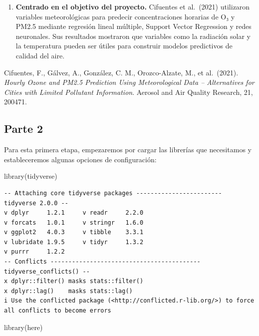 \documentclass[
  letterpaper,
  DIV=11,
  numbers=noendperiod]{scrartcl}
\newenvironment{Shaded}{\begin{snugshade}}{\end{snugshade}}
\newcommand{\FunctionTok}[1]{\textcolor[rgb]{0.28,0.35,0.67}{#1}}
\newcommand{\NormalTok}[1]{\textcolor[rgb]{0.00,0.23,0.31}{#1}}
\providecommand{\tightlist}{%
  \setlength{\itemsep}{0pt}\setlength{\parskip}{0pt}}
\begin{document}
\begin{enumerate}
\def\labelenumi{\Alph{enumi})}
\setcounter{enumi}{1}
\tightlist
\item
  \textbf{Centrado en el objetivo del proyecto.} Cifuentes et al.~(2021)
  utilizaron variables meteorológicas para predecir concentraciones
  horarias de O₃ y PM2.5 mediante regresión lineal múltiple, Support
  Vector Regression y redes neuronales. Sus resultados mostraron que
  variables como la radiación solar y la temperatura pueden ser útiles
  para construir modelos predictivos de calidad del aire.
\end{enumerate}

Cifuentes, F., Gálvez, A., González, C. M., Orozco-Alzate, M., et
al.~(2021). \emph{Hourly Ozone and PM2.5 Prediction Using Meteorological
Data -- Alternatives for Cities with Limited Pollutant Information}.
Aerosol and Air Quality Research, 21, 200471.

\subsection{Parte 2}\label{parte-2}

Para esta primera etapa, empezaremos por cargar las librerías que
necesitamos y estableceremos algunas opciones de configuración:

\begin{Shaded}
\begin{Highlighting}[]
\FunctionTok{library}\NormalTok{(tidyverse)}
\end{Highlighting}
\end{Shaded}

\begin{verbatim}
-- Attaching core tidyverse packages ------------------------ tidyverse 2.0.0 --
v dplyr     1.2.1     v readr     2.2.0
v forcats   1.0.1     v stringr   1.6.0
v ggplot2   4.0.3     v tibble    3.3.1
v lubridate 1.9.5     v tidyr     1.3.2
v purrr     1.2.2     
-- Conflicts ------------------------------------------ tidyverse_conflicts() --
x dplyr::filter() masks stats::filter()
x dplyr::lag()    masks stats::lag()
i Use the conflicted package (<http://conflicted.r-lib.org/>) to force all conflicts to become errors
\end{verbatim}

\begin{Shaded}
\begin{Highlighting}[]
\FunctionTok{library}\NormalTok{(here)}
\end{Highlighting}
\end{Shaded}
\end{document}
